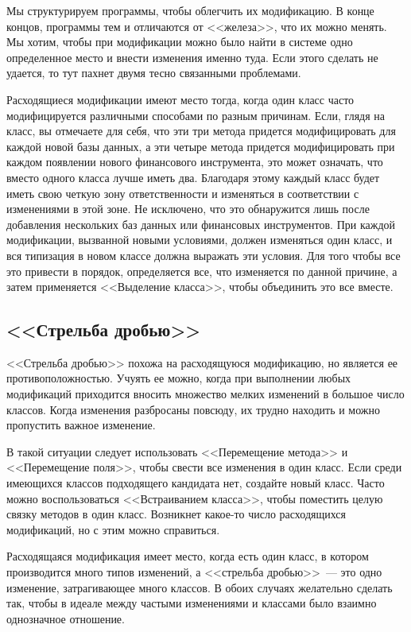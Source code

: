 \documentclass{../../text-style}
\begin{document}
Мы структурируем программы, чтобы облегчить их модификацию. В конце концов, программы тем и отличаются от <<железа>>, что их можно менять. Мы хотим, чтобы при модификации можно было найти в системе одно определенное место и внести изменения именно туда. Если этого сделать не удается, то тут пахнет двумя тесно связанными проблемами.

Расходящиеся модификации имеют место тогда, когда один класс часто модифицируется различными способами по разным причинам. Если, глядя на класс, вы отмечаете для себя, что эти три метода придется модифицировать для каждой новой базы данных, а эти четыре метода придется модифицировать при каждом появлении нового финансового инструмента, это может означать, что вместо одного класса лучше иметь два. Благодаря этому каждый класс будет иметь свою четкую зону ответственности и изменяться в соответствии с изменениями в этой зоне. Не исключено, что это обнаружится лишь после добавления нескольких баз данных или финансовых инструментов. При каждой модификации, вызванной новыми условиями, должен изменяться один класс, и вся типизация в новом классе должна выражать эти условия. Для того чтобы все это привести в порядок, определяется все, что изменяется по данной причине, а затем применяется <<Выделение класса>>, чтобы объединить это все вместе.

\subsection{<<Стрельба дробью>>}

<<Стрельба дробью>> похожа на расходящуюся модификацию, но является ее противоположностью. Учуять ее можно, когда при выполнении любых модификаций приходится вносить множество мелких изменений в большое число классов. Когда изменения разбросаны повсюду, их трудно находить и можно пропустить важное изменение.

В такой ситуации следует использовать <<Перемещение метода>> и <<Перемещение поля>>, чтобы свести все изменения в один класс. Если среди имеющихся классов подходящего кандидата нет, создайте новый класс. Часто можно воспользоваться <<Встраиванием класса>>, чтобы поместить целую связку методов в один класс. Возникнет какое-то число расходящихся модификаций, но с этим можно справиться.

Расходящаяся модификация имеет место, когда есть один класс, в котором производится много типов изменений, а <<стрельба дробью>>~--- это одно изменение, затрагивающее много классов. В обоих случаях желательно сделать так, чтобы в идеале между частыми изменениями и классами было взаимно однозначное отношение.
\end{document}

